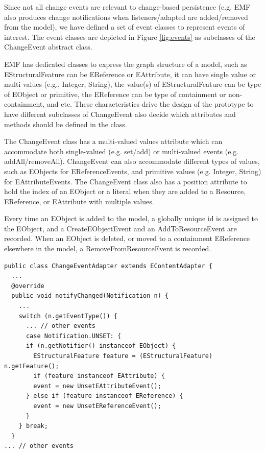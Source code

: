 Since not all change events are relevant to change-based persistence (e.g. EMF also produces change notifications when listeners/adapted are added/removed from the model), we have defined a set of event classes to represent events of interest. The event classes are depicted in Figure \ref{fig:events} as subclasses of the \textsf{ChangeEvent} abstract class.

EMF has dedicated classes to express the graph structure of a model, such as \textsf{EStructuralFeature} can be \textsf{EReference} or \textsf{EAttribute}, it can have single value or multi values (e.g., Integer, String), the value(s) of \textsf{EStructuralFeature} can be type of \textsf{EObject} or primitive, the \textsf{EReference} can be type of containment or non-containment, and etc. These characteristics drive the design of the prototype to have different subclasses of \textsf{ChangeEvent} also decide which attributes and methods should be defined in the class. 

The \textsf{ChangeEvent} class has a multi-valued \textsf{values} attribute which can accommodate both single-valued (e.g. set/add) or multi-valued events (e.g. addAll/removeAll). \textsf{ChangeEvent} can also accommodate different types of values, such as \textsf{EObject}s for \textsf{EReferenceEvents}, and primitive values (e.g. Integer, String) for \textsf{EAttributeEvents}. The \textsf{ChangeEvent} class also has a position attribute to hold the  index of an \textsf{EObject} or a literal when they are added to a \textsf{Resource}, \textsf{EReference}, or \textsf{EAttribute} with multiple values. 

Every time an \textsf{EObject} is added to the model, a globally unique id is assigned to the \textsf{EObject}, and a \textsf{CreateEObjectEvent} and an \textsf{AddToResourceEvent} are recorded. When an EObject is deleted, or moved to a containment \textsf{EReference} elsewhere in the model, a \textsf{RemoveFromResourceEvent}
is recorded.

\vspace{-20pt}
\begin{lstlisting}[style=java,caption={Simplified Java code to handle notification events.},label=lst:javacode]
public class ChangeEventAdapter extends EContentAdapter {
  ...
  @override
  public void notifyChanged(Notification n) {
    ...
    switch (n.getEventType()) {
      ... // other events
      case Notification.UNSET: {
      if (n.getNotifier() instanceof EObject) {
        EStructuralFeature feature = (EStructuralFeature) n.getFeature();
        if (feature instanceof EAttribute) {
        event = new UnsetEAttributeEvent();
      } else if (feature instanceof EReference) {
        event = new UnsetEReferenceEvent();
      }
    } break;
  } 
... // other events
\end{lstlisting}	

